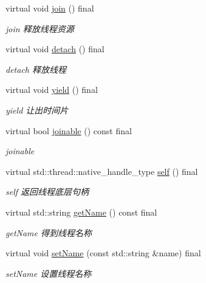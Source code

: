 \begin{DoxyCompactItemize}
\mbox{\label{classThread_a07b23d8d75300651cba3eb79652c77fd}} 
virtual void \hyperlink{classThread_a07b23d8d75300651cba3eb79652c77fd}{join} () final
\begin{DoxyCompactList}\small\item\em join 释放线程资源 \end{DoxyCompactList}\item 
\mbox{\label{classThread_affb34b8590eab79785627ae48cbd297d}} 
virtual void \hyperlink{classThread_affb34b8590eab79785627ae48cbd297d}{detach} () final
\begin{DoxyCompactList}\small\item\em detach 释放线程 \end{DoxyCompactList}\item 
\mbox{\label{classThread_ac09e8b8ff4fb0a97315b5a501e722783}} 
virtual void \hyperlink{classThread_ac09e8b8ff4fb0a97315b5a501e722783}{yield} () final
\begin{DoxyCompactList}\small\item\em yield 让出时间片 \end{DoxyCompactList}\item 
virtual bool \hyperlink{classThread_a86d1c278c0b9fea63037c437a909064f}{joinable} () const final
\begin{DoxyCompactList}\small\item\em joinable \end{DoxyCompactList}\item 
virtual std\+::thread\+::native\+\_\+handle\+\_\+type \hyperlink{classThread_a554185abbfacbcc4bf2e953cdddcbbba}{self} () final
\begin{DoxyCompactList}\small\item\em self 返回线程底层句柄 \end{DoxyCompactList}\item 
virtual std\+::string \hyperlink{classThread_a19bc237f8a86727a5a4b516122fe20f6}{get\+Name} () const final
\begin{DoxyCompactList}\small\item\em get\+Name 得到线程名称 \end{DoxyCompactList}\item 
virtual void \hyperlink{classThread_ae816904b2a3e248472813e17c2b12a71}{set\+Name} (const std\+::string \&name) final
\begin{DoxyCompactList}\small\item\em set\+Name 设置线程名称 \end{DoxyCompactList}\item 

\end{DoxyCompactItemize}
